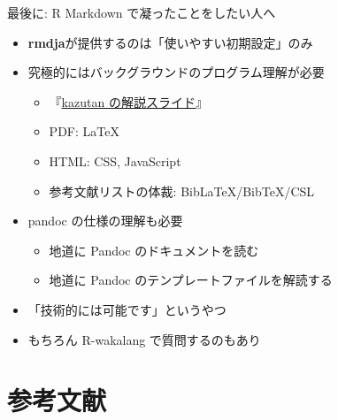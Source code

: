 \documentclass[
  ignorenonframetext,
]{beamer}
\newif\ifbibliography
\providecommand{\tightlist}{%
  \setlength{\itemsep}{0pt}\setlength{\parskip}{0pt}}
\begin{document}
\begin{frame}{最後に: R Markdown で凝ったことをしたい人へ}
\protect\hypertarget{ux6700ux5f8cux306b-r-markdown-ux3067ux51ddux3063ux305fux3053ux3068ux3092ux3057ux305fux3044ux4ebaux3078}{}
\begin{itemize}
\item
  \textbf{rmdja}が提供するのは「使いやすい初期設定」のみ
\item
  究極的にはバックグラウンドのプログラム理解が必要

  \begin{itemize}
  \tightlist
  \item
    『\href{http://kz-md.net/stat/tmp_box/intoTheRmarkdown.html\#/}{kazutan
    の解説スライド}』
  \item
    PDF: LaTeX
  \item
    HTML: CSS, JavaScript
  \item
    参考文献リストの体裁: BibLaTeX/BibTeX/CSL
  \end{itemize}
\item
  pandoc の仕様の理解も必要

  \begin{itemize}
  \tightlist
  \item
    地道に Pandoc のドキュメントを読む
  \item
    地道に Pandoc のテンプレートファイルを解読する
  \end{itemize}
\item
  「技術的には可能です」というやつ
\item
  もちろん R-wakalang で質問するのもあり
\end{itemize}
\end{frame}



\section*{参考文献}
\begin{frame}[allowframebreaks]
\bibliographytrue
\printbibliography[heading=none]
\end{frame}


\end{document}
